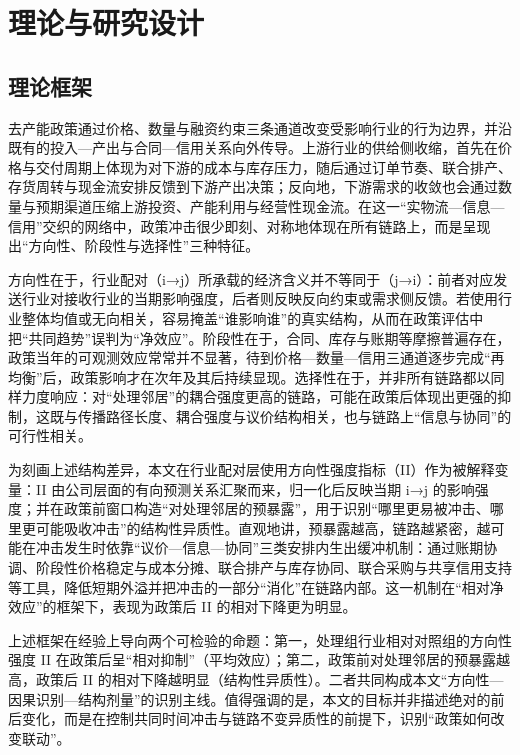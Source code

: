 \chapter{理论与研究设计}
\label{chap:theory}

\section{理论框架}
去产能政策通过价格、数量与融资约束三条通道改变受影响行业的行为边界，并沿既有的投入—产出与合同—信用关系向外传导。上游行业的供给侧收缩，首先在价格与交付周期上体现为对下游的成本与库存压力，随后通过订单节奏、联合排产、存货周转与现金流安排反馈到下游产出决策；反向地，下游需求的收敛也会通过数量与预期渠道压缩上游投资、产能利用与经营性现金流。在这一“实物流—信息—信用”交织的网络中，政策冲击很少即刻、对称地体现在所有链路上，而是呈现出“方向性、阶段性与选择性”三种特征。

方向性在于，行业配对（i→j）所承载的经济含义并不等同于（j→i）：前者对应发送行业对接收行业的当期影响强度，后者则反映反向约束或需求侧反馈。若使用行业整体均值或无向相关，容易掩盖“谁影响谁”的真实结构，从而在政策评估中把“共同趋势”误判为“净效应”。阶段性在于，合同、库存与账期等摩擦普遍存在，政策当年的可观测效应常常并不显著，待到价格—数量—信用三通道逐步完成“再均衡”后，政策影响才在次年及其后持续显现。选择性在于，并非所有链路都以同样力度响应：对“处理邻居”的耦合强度更高的链路，可能在政策后体现出更强的抑制，这既与传播路径长度、耦合强度与议价结构相关，也与链路上“信息与协同”的可行性相关。

为刻画上述结构差异，本文在行业配对层使用方向性强度指标（II）作为被解释变量：II 由公司层面的有向预测关系汇聚而来，归一化后反映当期 i→j 的影响强度；并在政策前窗口构造“对处理邻居的预暴露”，用于识别“哪里更易被冲击、哪里更可能吸收冲击”的结构性异质性。直观地讲，预暴露越高，链路越紧密，越可能在冲击发生时依靠“议价—信息—协同”三类安排内生出缓冲机制：通过账期协调、阶段性价格稳定与成本分摊、联合排产与库存协同、联合采购与共享信用支持等工具，降低短期外溢并把冲击的一部分“消化”在链路内部。这一机制在“相对净效应”的框架下，表现为政策后 II 的相对下降更为明显。

上述框架在经验上导向两个可检验的命题：第一，处理组行业相对对照组的方向性强度 II 在政策后呈“相对抑制”（平均效应）；第二，政策前对处理邻居的预暴露越高，政策后 II 的相对下降越明显（结构性异质性）。二者共同构成本文“方向性—因果识别—结构剂量”的识别主线。值得强调的是，本文的目标并非描述绝对的前后变化，而是在控制共同时间冲击与链路不变异质性的前提下，识别“政策如何改变联动”。

